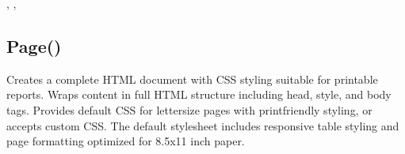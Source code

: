 \documentclass[letterpaper,10pt,english]{sphinxmanual}
\begin{document}
\sphinxAtStartPar
{}

\begin{sphinxVerbatim}[commandchars=\\\{\}]
\end{sphinxVerbatim}

\sphinxAtStartPar
{}

\begin{sphinxVerbatim}[commandchars=\\\{\}]
\end{sphinxVerbatim}

\sphinxAtStartPar
{}

\sphinxAtStartPar
{}, , 

\ignorespaces 

\subsection{Page()}
\label{\detokenize{reference/html:page}}\label{\detokenize{reference/html:index-10}}
\sphinxAtStartPar
{}

\sphinxAtStartPar
Creates a complete HTML document with CSS styling suitable for printable reports. Wraps content in full HTML structure including head, style, and body tags. Provides default CSS for letter\sphinxhyphen{}size pages with print\sphinxhyphen{}friendly styling, or accepts custom CSS. The default stylesheet includes responsive table styling and page formatting optimized for 8.5x11 inch paper.

\sphinxAtStartPar
{}

\begin{sphinxVerbatim}[commandchars=\\\{\}]
\end{sphinxVerbatim}
\end{document}
